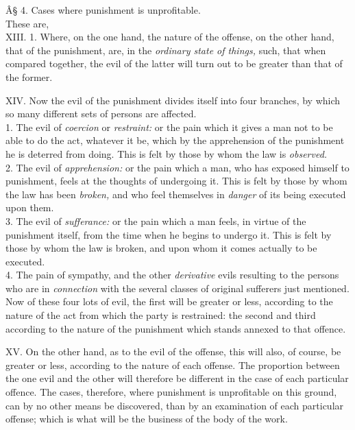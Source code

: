 \documentclass[12pt]{report}
\begin{document}
Â§ 4. Cases where punishment is unprofitable.\\
These are,\\
XIII. 1. Where, on the one hand, the nature of the offense, on the other
hand, that of the punishment, are, in the \emph{ordinary state of
things,} such, that when compared together, the evil of the latter will
turn out to be greater than that of the former.

XIV. Now the evil of the punishment divides itself into four branches,
by which so many different sets of persons are affected.\\
1. The evil of \emph{coercion} or \emph{restraint:} or the pain which it
gives a man not to be able to do the act, whatever it be, which by the
apprehension of the punishment he is deterred from doing. This is felt
by those by whom the law is \emph{observed.}\\
2. The evil of \emph{apprehension:} or the pain which a man, who has
exposed himself to punishment, feels at the thoughts of undergoing it.
This is felt by those by whom the law has been \emph{broken,} and who
feel themselves in \emph{danger} of its being executed upon them.\\
3. The evil of \emph{sufferance:} or the pain which a man feels, in
virtue of the punishment itself, from the time when he begins to undergo
it. This is felt by those by whom the law is broken, and upon whom it
comes actually to be executed.\\
4. The pain of sympathy, and the other \emph{derivative} evils resulting
to the persons who are in \emph{connection} with the several classes of
original sufferers just mentioned. Now of these four lots of evil, the
first will be greater or less, according to the nature of the act from
which the party is restrained: the second and third according to the
nature of the punishment which stands annexed to that offence.

XV. On the other hand, as to the evil of the offense, this will also, of
course, be greater or less, according to the nature of each offense. The
proportion between the one evil and the other will therefore be
different in the case of each particular offence. The cases, therefore,
where punishment is unprofitable on this ground, can by no other means
be discovered, than by an examination of each particular offense; which
is what will be the business of the body of the work.
\end{document}
